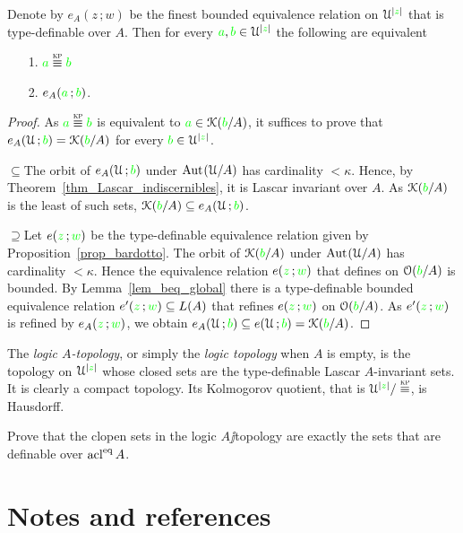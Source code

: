 \documentclass[creche.tex]{subfiles}
\begin{document}
\begin{theorem}\label{thm_Krupinski}
Denote by $e_A(z\,;w)$ be the finest bounded equivalence relation on $\EuScript U^{|{\color{green} z}|}$ that is type-definable over $A$. Then for every ${\color{green} a}, {\color{green} b}\in\EuScript U^{|{\color{green} z}|}$ the following are equivalent
 \begin{itemize}
\item[1.] ${\gr a}\equivKP{\gr b}$
\item[2.] $e_A({\color{green} a}\,;{\color{green} b})$.\QED
\end{itemize} 
\end{theorem}
\begin{proof} 
  As  ${\gr a}\equivKP{\gr b}$ is equivalent to ${\color{green} a}\in\EuScript K({\color{green} b}/A)$, it suffices to prove that $e_A(\EuScript U\,;{\color{green} b})=\EuScript K({\color{green} b}/A)$ for every ${\color{green} b}\in\EuScript U^{|{\color{green} z}|}$. 
 
  $\subseteq$\quad The orbit of $e_A(\EuScript U\,;{\color{green} b})$ under ${\rm Aut\kern.15ex}(\EuScript U/A)$ has cardinality $<\kappa$. Hence, by Theorem~\ref{thm_Lascar_indiscernibles}, it is  Lascar invariant over $A$. As $\EuScript K({\color{green} b}/A)$ is the least of such sets, $\EuScript K({\color{green} b}/A)\subseteq e_A(\EuScript U\,;{\color{green} b})$.
  
  $\supseteq$\quad Let $e({\color{green} z}\,;{\color{green} w})$ be the type-definable equivalence relation given by Proposition~\ref{prop_bardotto}. 
  The orbit of $\EuScript K({\color{green} b}/A)$ under ${\rm Aut\kern.15ex}(\EuScript U/A)$ has cardinality $<\kappa$. 
  Hence the equivalence relation $e({\color{green} z}\,;{\color{green} w})$ that defines on $\EuScript O({\color{green} b}/A)$ is bounded. 
  By Lemma~\ref{lem_beq_global} there is a type-definable bounded equivalence relation $e'({\color{green} z}\,;{\color{green} w})\subseteq L(A)$ that refines $e({\color{green} z}\,;{\color{green} w})$ on $\EuScript O({\color{green} b}/A)$. 
  As $e'({\color{green} z}\,;{\color{green} w})$ is refined by $e_A({\color{green} z}\,;{\color{green} w})$, we obtain $e_A(\EuScript U\,;{\color{green} b})\subseteq e(\EuScript U\,;{\color{green} b})=\EuScript K({\color{green} b}/A)$.
\end{proof}

The \emph{logic $A$-topology}, or simply the  \emph{logic topology} when $A$ is empty, is the topology on $\EuScript U^{|{\color{green} z}|}$ whose closed sets are the type-definable Lascar $A$-invariant sets. It is clearly a compact topology. Its Kolmogorov quotient, that is $\U^{|{\gr z}|}/\equivKP$, is Hausdorff.

\begin{exercise}
Prove that the clopen sets in the logic $A\jj$topology are exactly the sets that are definable over $\mathop{\rm acl}^{{\rm eq}} A$.\QED
\end{exercise}

\section{Notes and references}
\end{document}
